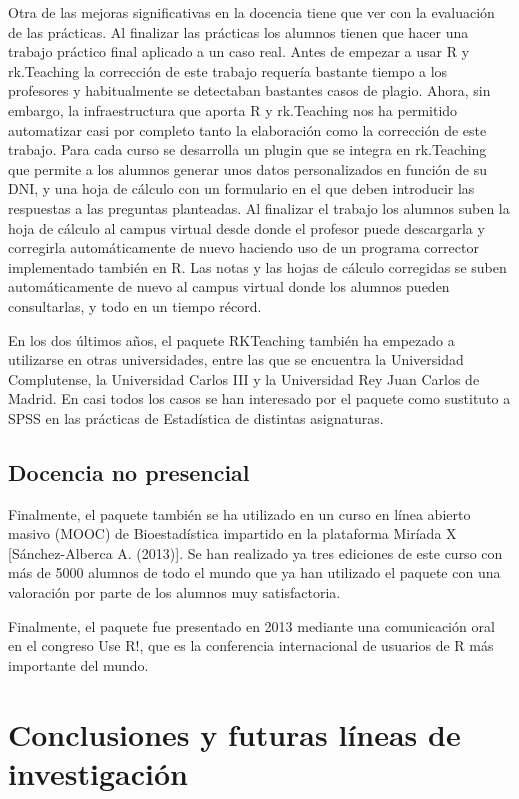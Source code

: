 \documentclass[a4paper,10pt,twoside]{article}
\newcommand{\rkteaching}{\textsf{rk.Teaching}}
\newcommand{\spss}{\textsf{SPSS}}
\begin{document}
Otra de las mejoras significativas en la docencia tiene que ver con la evaluación de las prácticas.
Al finalizar las prácticas los alumnos tienen que hacer una trabajo práctico final aplicado a un caso real.
Antes de empezar a usar R y \rkteaching{} la corrección de este trabajo requería bastante tiempo a los profesores y
habitualmente se detectaban bastantes casos de plagio.
Ahora, sin embargo, la infraestructura que aporta R y \rkteaching{} nos ha permitido automatizar casi por completo tanto
la elaboración como la corrección de este trabajo. 
Para cada curso se desarrolla un plugin que se integra en \rkteaching{} que permite a los alumnos generar unos datos
personalizados en función de su DNI, y una hoja de cálculo con un formulario en el que deben introducir las respuestas a
las preguntas planteadas.
Al finalizar el trabajo los alumnos suben la hoja de cálculo al campus virtual desde donde el profesor puede
descargarla y corregirla automáticamente de nuevo haciendo uso de un programa corrector implementado también en R.
Las notas y las hojas de cálculo corregidas se suben automáticamente de nuevo al campus virtual donde los alumnos pueden
consultarlas, y todo en un tiempo récord. 

En los dos últimos años, el paquete RKTeaching también ha empezado a utilizarse en otras universidades, entre las que se encuentra la
Universidad Complutense, la Universidad Carlos III y la Universidad Rey Juan Carlos de Madrid.
En casi todos los casos se han interesado por el paquete como sustituto a \spss{} en las prácticas de Estadística de
distintas asignaturas.

\subsection{Docencia no presencial}
Finalmente, el paquete también se ha utilizado en un curso en línea abierto masivo (MOOC) de Bioestadística impartido en
la plataforma Miríada X [Sánchez-Alberca A. (2013)]. Se han realizado ya tres ediciones de este curso con más de 5000
alumnos de todo el mundo que ya han utilizado el paquete con una valoración por parte de los alumnos muy satisfactoria.

Finalmente, el paquete fue presentado en 2013 mediante una comunicación oral en el congreso Use R!, que es la
conferencia internacional de usuarios de R más importante del mundo. 

\section{Conclusiones y futuras líneas de investigación}
\label{s:conclusiones}
\end{document}
